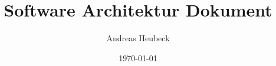 \subject{Merchant Onboarding}
\title{Software Architektur Dokument}
\author{Andreas Heubeck}
\date{\today}

\maketitle